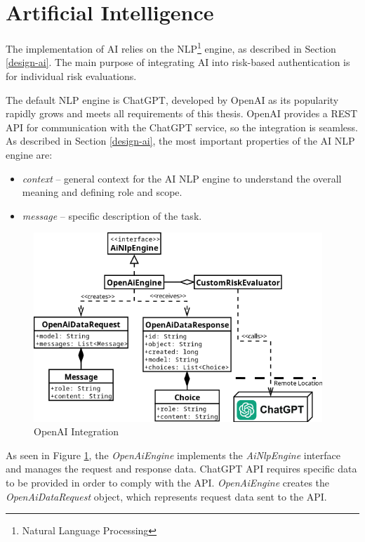 \newpage
\section{Artificial Intelligence}
The implementation of AI relies on the NLP\footnote{Natural Language Processing} engine, as described in Section \ref{design-ai}.
The main purpose of integrating AI into risk-based authentication is for individual risk evaluations.

The default NLP engine is ChatGPT, developed by OpenAI as its popularity rapidly grows and meets all requirements of this thesis.
OpenAI provides a REST API for communication with the ChatGPT service, so the integration is seamless.
\newline
\newline
As described in Section \ref{design-ai}, the most important properties of the AI NLP engine are:

\begin{itemize}
    \item \textit{context} -- general context for the AI NLP engine to understand the overall meaning and defining role and scope.
    \item \textit{message} -- specific description of the task.  
\end{itemize}

\begin{figure}[htbp]
  \centering
  \includegraphics[width=0.97\textwidth]{img/sections/6-implementation/ai-engine-openai.png}
  \caption{OpenAI Integration}
  \label{fig:impl-ai-openai-integration}
\end{figure}

\newpage

As seen in Figure \ref{fig:impl-ai-openai-integration}, the \textit{OpenAiEngine} implements the \textit{AiNlpEngine} interface and manages the request and response data.
ChatGPT API requires specific data to be provided in order to comply with the API.
\textit{OpenAiEngine} creates the \textit{OpenAiDataRequest} object, which represents request data sent to the API.

